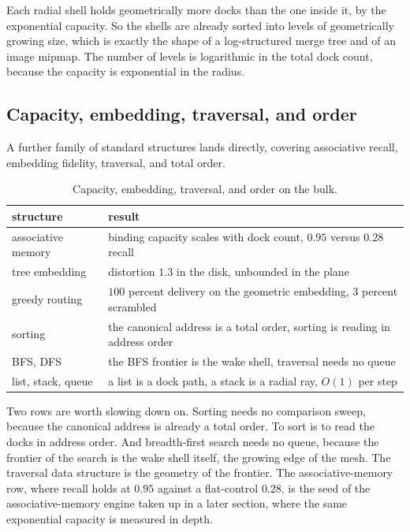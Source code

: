 Each radial shell holds geometrically more docks than the one inside it, by the exponential capacity. So the shells are already sorted into levels of geometrically growing size, which is exactly the shape of a log-structured merge tree and of an image mipmap. The number of levels is logarithmic in the total dock count, because the capacity is exponential in the radius.

\subsection{Capacity, embedding, traversal, and order}

A further family of standard structures lands directly, covering associative recall, embedding fidelity, traversal, and total order.

\begin{table}[ht]
\centering
\begin{tabular}{@{}ll@{}}
\toprule
structure & result \\
\midrule
associative memory & binding capacity scales with dock count, $0.95$ versus $0.28$ recall \\
tree embedding & distortion $1.3$ in the disk, unbounded in the plane \\
greedy routing & $100$ percent delivery on the geometric embedding, $3$ percent scrambled \\
sorting & the canonical address is a total order, sorting is reading in address order \\
BFS, DFS & the BFS frontier is the wake shell, traversal needs no queue \\
list, stack, queue & a list is a dock path, a stack is a radial ray, $O(1)$ per step \\
\bottomrule
\end{tabular}
\caption{Capacity, embedding, traversal, and order on the bulk.}
\label{tab:capacity-structures}
\end{table}

Two rows are worth slowing down on. Sorting needs no comparison sweep, because the canonical address is already a total order. To sort is to read the docks in address order. And breadth-first search needs no queue, because the frontier of the search is the wake shell itself, the growing edge of the mesh. The traversal data structure is the geometry of the frontier. The associative-memory row, where recall holds at $0.95$ against a flat-control $0.28$, is the seed of the associative-memory engine taken up in a later section, where the same exponential capacity is measured in depth.

